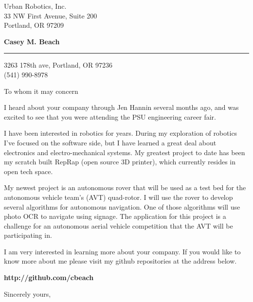 \documentclass{letter} %
\begin{document}
\signature{Casey M. Beach}           %
\longindentation=0pt                       %
\let\raggedleft\raggedright                %
 
 
\begin{letter}{Urban Robotics, Inc. \\
33 NW First Avenue, Suite 200 \\
Portland, OR 97209 }

\begin{flushleft}
{\large\bf Casey M. Beach}
\end{flushleft}
\medskip\hrule height 1pt
\begin{flushright}
\hfill 3263 178th ave, Portland, OR 97236 \\
\hfill (541) 990-8978 
\end{flushright} 
\vfill %

 
\opening{To whom it may concern} 
\begin{flushleft} 
\noindent I heard about your company through Jen Hannin several months ago, and was excited to see that you were attending the 
PSU engineering career fair.


\noindent I have been interested in robotics for years.  During my exploration of robotics I've focused on 
the software side, but I have learned a great deal about electronics and electro-mechanical systems.  
My greatest project to date has been my scratch built RepRap (open source 3D printer), which currently resides in open 
tech space.

My newest project is an autonomous rover that will be used as a test bed for the autonomous vehicle team's (AVT)
quad-rotor.  I will use the rover to develop several algorithms for autonomous navigation.  One of those algorithms 
will use photo OCR to navigate using signage.  The application for this project is a challenge for an autonomous 
aerial vehicle competition that the AVT will be participating in.

I am very interested in learning more about your company.  If you would like to know more about me please visit my github
repositories at the address below. \\ 
\end{flushleft}
\begin{center}
	\textbf{http://github.com/cbeach}
\end{center}


\closing{Sincerely yours,} 
 

 

\end{letter}
 
\end{document}
